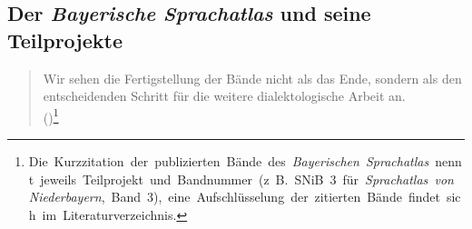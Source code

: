 \subsection{Der \textit{Bayerische Sprachatlas} und seine Teilprojekte}
\label{sec:6.2.1}

\begin{quote}
Wir sehen die Fertigstellung der Bände nicht als das Ende, sondern als den entscheidenden Schritt für die weitere dialektologische Arbeit an. \\\hbox{}\hfill\hbox{(\citealt[7]{SNiB3})\footnote{Die Kurzzitation der publizierten Bände des \textit{Bayerischen Sprachatlas} nennt jeweils Teilprojekt und Bandnummer (z~B. SNiB 3 für \textit{Sprachatlas von Niederbayern}, Band 3), eine Aufschlüsselung der zitierten Bände findet sich im Literaturverzeichnis.}}
\end{quote}

